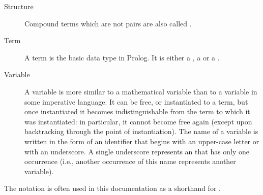 \begin{description}
\item[Structure]
Compound terms which are not pairs are also called .

\item[Term]
A term is the basic data type in Prolog.
It is either a , a  or a .

\item[Variable]
A variable is more similar to a mathematical variable than to a variable in some
imperative language.  It can be free, or instantiated to a term, but once
instantiated it becomes indistinguishable from the term to which it was
instantiated: in particular, it cannot become free again (except upon
backtracking through the point of instantiation).
The name of a variable is written in the form of an identifier that begins with
an upper-case letter or with an underscore.  A single underscore represents an
 that has only one
occurrence (i.e., another occurrence of this name represents another variable).

\end{description}

The notation  is often used in this documentation
as a shorthand for .

